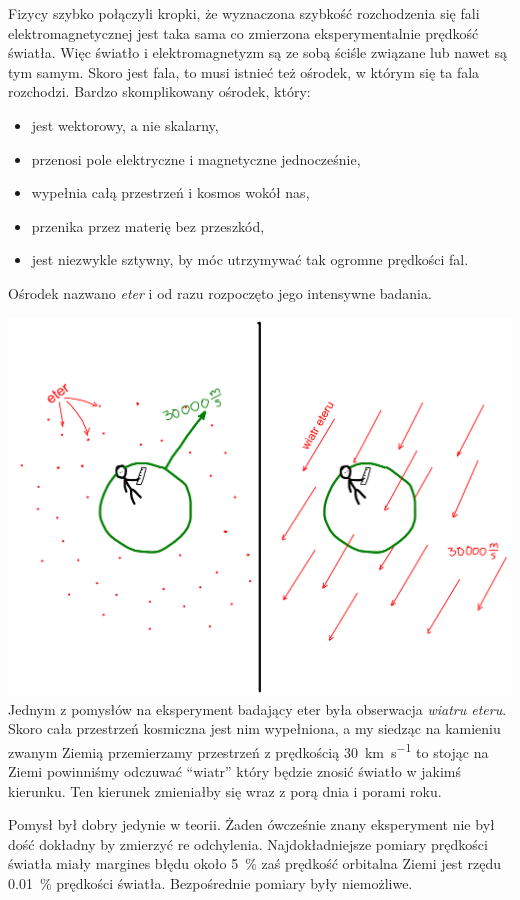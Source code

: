 \documentclass[10pt,twocolumn,fleqn,polish]{article}
\begin{document}
Fizycy szybko połączyli kropki, że wyznaczona szybkość rozchodzenia się fali
elektromagnetycznej jest taka sama co zmierzona eksperymentalnie prędkość
światła. Więc światło i elektromagnetyzm są ze sobą ściśle
związane lub nawet są tym samym.
Skoro jest fala, to musi istnieć też ośrodek, w którym się ta fala rozchodzi.
Bardzo skomplikowany ośrodek, który:
\begin{itemize}
  \item jest wektorowy, a nie skalarny,
  \item przenosi pole elektryczne i magnetyczne jednocześnie,
  \item wypełnia całą przestrzeń i kosmos wokół nas,
  \item przenika przez materię bez przeszkód,
  \item jest niezwykle sztywny, by móc utrzymywać tak ogromne prędkości fal.
\end{itemize}
Ośrodek nazwano \textit{eter} i od razu rozpoczęto jego intensywne badania.
\newpage

\noindent\includegraphics[width=1\linewidth]{pages/STA-page10}
Jednym z pomysłów na eksperyment badający eter była obserwacja \textit{wiatru eteru}.
Skoro cała przestrzeń kosmiczna jest nim wypełniona, a my siedząc na kamieniu
zwanym Ziemią przemierzamy przestrzeń z prędkością \SI{30}{\kilo\meter\per\second}
to stojąc na Ziemi powinniśmy odczuwać ``wiatr'' który będzie znosić światło
w jakimś kierunku. Ten kierunek zmieniałby się wraz z porą dnia i porami roku.

Pomysł był dobry jedynie w teorii. Żaden ówcześnie znany eksperyment nie był dość
dokładny by zmierzyć re odchylenia.
Najdokładniejsze pomiary prędkości światła miały margines błędu około
\SI{5}{\percent} zaś prędkość orbitalna Ziemi jest rzędu \SI{0.01}{\percent}
prędkości światła. Bezpośrednie pomiary były niemożliwe.
\newpage
\end{document}
